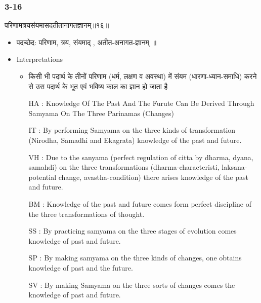 \begin{frame}[fragile]\frametitle{3-16}
\begin{sanskrit}
परिणामत्रयसंयमासदतीतानागतज्ञानम्॥१६॥
\end{sanskrit}

	\begin{itemize}
	\item पदच्छेद: परिणाम, त्रय, संयमाद् , अतीत-अनागत-ज्ञानम् ॥
	\item Interpretations
		\begin{itemize}	
		\item किसी भी पदार्थ के तीनों परिणाम (धर्म, लक्षण व अवस्था) में संयम (धारणा-ध्यान-समाधि) करने से उस पदार्थ के भूत एवं भविष्य काल का ज्ञान हो जाता है
		\item [HA]: Knowledge Of The Past And The Furute Can Be Derived Through Samyama On The Three Parinamas (Changes)
		\item [IT]: By performing Samyama on the three kinds of transformation (Nirodha, Samadhi and Ekagrata) knowledge of the past and future.
		\item [VH]: Due to the sanyama (perfect regulation of citta by dharma, dyana, samahdi) on the three transformations (dharma-characteristi, laksana-potential change, avastha-condition) there arises knowledge of the past and future.
		\item [BM]: Knowledge of the past and future comes form perfect discipline of the three transformations of thought.
		\item [SS]: By practicing samyama on the three stages of evolution comes knowledge of past and future.
		\item [SP]: By making samyama on the three kinds of changes, one obtains knowledge of past and the future.
		\item [SV]: By making Samyama on the three sorts of changes comes the knowledge of past and future. 
		\end{itemize}
	\end{itemize}
\end{frame}

